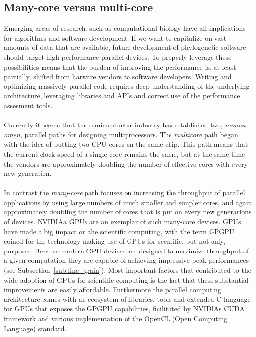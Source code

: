 \subsection{Many-core versus multi-core}

Emerging areas of research, such as computational biology have all implications for algorithms and software development.
If we want to capitalize on vast amounts of data that are available, future development of phylogenetic software should target high performance parallel devices.
To properly leverage these possibilities means that the burden of improving the performance is, at least partially, shifted from harware vendors to software developers.
Writing and optimizing massively parallel code requires deep understanding of the underlying architecture, leveraging libraries and APIs and correct use of the performance assesment tools.

\paragraph{}
Currently it seems that the semiconductor industry has established two, \textit{nomen omen}, parallel paths for designing multiprocessors.
The \textit{multicore} path began with the idea of putting two CPU cores on the same chip.
This path means that the current clock speed of a single core remains the same, but at the same time the vendors are approximately doubling the number of effective cores with every new generation.

\paragraph{}
In contrast the \textit{many-core} path focuses on increasing the throughput of parallel applications by using large numbers of much smaller and simpler cores, and again approximately doubling the number of cores that is put on every new generations of devices. 
NVIDIAa GPUs are an exemplar of such many-core devices.
GPUs \citep{Nickolls2008} have made a big impact on the scientific computing, with the term GPGPU coined for the technology making use of GPUs for scentific, but not only, purposes.
Because modern GPU devices are designed to maximize throughput of a given computation they are capable of achieving impressive peak performances (see Subsection~\ref{sub:fine_grain}).
Most important factors that contributed to the wide adoption of GPUs for scientific computing is the fact that these substantial improvements are easily affordable. 
Furthermore the parallel computing architecture comes with an ecosystem of libraries, tools and extended C language for GPUs that exposes the GPGPU capabilities, ficilitated by NVIDIAs CUDA framework and various implementation of the OpenCL (Open Computing Language) standard.

